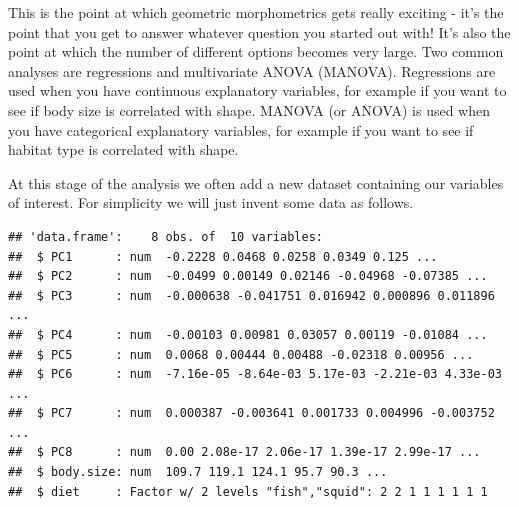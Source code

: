 \documentclass[]{book}
\newenvironment{Shaded}{\begin{snugshade}}{\end{snugshade}}
\newcommand{\KeywordTok}[1]{\textcolor[rgb]{0.13,0.29,0.53}{\textbf{{#1}}}}
\newcommand{\DataTypeTok}[1]{\textcolor[rgb]{0.13,0.29,0.53}{{#1}}}
\newcommand{\DecValTok}[1]{\textcolor[rgb]{0.00,0.00,0.81}{{#1}}}
\newcommand{\StringTok}[1]{\textcolor[rgb]{0.31,0.60,0.02}{{#1}}}
\newcommand{\CommentTok}[1]{\textcolor[rgb]{0.56,0.35,0.01}{\textit{{#1}}}}
\newcommand{\NormalTok}[1]{{#1}}
\begin{document}
This is the point at which geometric morphometrics gets really exciting
- it's the point that you get to answer whatever question you started
out with! It's also the point at which the number of different options
becomes very large. Two common analyses are regressions and multivariate
ANOVA (MANOVA). Regressions are used when you have continuous
explanatory variables, for example if you want to see if body size is
correlated with shape. MANOVA (or ANOVA) is used when you have
categorical explanatory variables, for example if you want to see if
habitat type is correlated with shape.

At this stage of the analysis we often add a new dataset containing our
variables of interest. For simplicity we will just invent some data as
follows.

\begin{Shaded}
\end{Shaded}

\begin{verbatim}
## 'data.frame':    8 obs. of  10 variables:
##  $ PC1      : num  -0.2228 0.0468 0.0258 0.0349 0.125 ...
##  $ PC2      : num  -0.0499 0.00149 0.02146 -0.04968 -0.07385 ...
##  $ PC3      : num  -0.000638 -0.041751 0.016942 0.000896 0.011896 ...
##  $ PC4      : num  -0.00103 0.00981 0.03057 0.00119 -0.01084 ...
##  $ PC5      : num  0.0068 0.00444 0.00488 -0.02318 0.00956 ...
##  $ PC6      : num  -7.16e-05 -8.64e-03 5.17e-03 -2.21e-03 4.33e-03 ...
##  $ PC7      : num  0.000387 -0.003641 0.001733 0.004996 -0.003752 ...
##  $ PC8      : num  0.00 2.08e-17 2.06e-17 1.39e-17 2.99e-17 ...
##  $ body.size: num  109.7 119.1 124.1 95.7 90.3 ...
##  $ diet     : Factor w/ 2 levels "fish","squid": 2 2 1 1 1 1 1 1
\end{verbatim}
\end{document}
